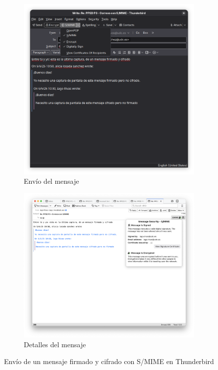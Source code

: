 \begin{figure}[H]
    \centering
    \begin{subfigure}{.5\textwidth}
        \centering
        \includegraphics[width=\linewidth]{thunderbird-smime-firmado-cifrado.png}
        \caption{Envío del mensaje}
    \end{subfigure}%
    \begin{subfigure}{.5\textwidth}
        \centering
        \includegraphics[width=1.2\linewidth]{thunderbird-smime-detalles-firmado-cifrado.png}
        \caption{Detalles del mensaje}
    \end{subfigure}
    \caption{Envío de un mensaje firmado y cifrado con S/MIME en Thunderbird}
\end{figure}
